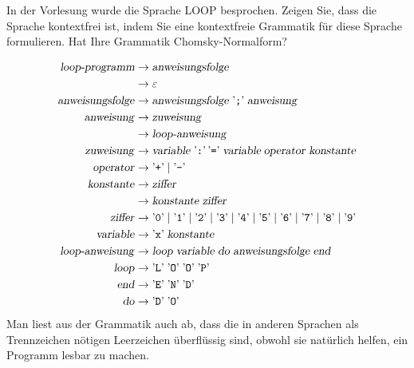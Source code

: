 In der Vorlesung wurde die Sprache LOOP besprochen. Zeigen Sie, dass
die Sprache kontextfrei ist, indem Sie eine
kontextfreie Grammatik für diese Sprache formulieren.
Hat Ihre Grammatik Chomsky-Normalform?


\begin{loesung}
\begin{align*}
\text{\textsl{loop-programm}}&\to\text{\textsl{anweisungsfolge}}\\
&\to\varepsilon\\
\text{\textsl{anweisungsfolge}}
&\to\text{\textsl{anweisungsfolge}}\;\text{'{\tt ;}'}\;
\text{\textsl{anweisung}}
\\
\text{\textsl{anweisung}}
&\to\text{\textsl{zuweisung}}
\\
&\to\text{\textsl{loop-anweisung}}
\\
\text{\textsl{zuweisung}}
&\to
\text{\textsl{variable}}\; \text{'{\tt :}'}\, \text{'{\tt =}'}\;
\textsl{variable}\;\text{\textsl{operator}}\;\text{\textsl{konstante}}
\\
\text{\textsl{operator}}
&\to\text{'{\tt +}'}\;|\;\text{'{\tt -}'}
\\
\text{\textsl{konstante}}&\to\text{\textsl{ziffer}}\\
&\to\text{\textsl{konstante}}\;\text{\textsl{ziffer}}
\\
\text{\textsl{ziffer}}&\to 
\text{'{\tt 0}'}\;|\;
\text{'{\tt 1}'}\;|\;
\text{'{\tt 2}'}\;|\;
\text{'{\tt 3}'}\;|\;
\text{'{\tt 4}'}\;|\;
\text{'{\tt 5}'}\;|\;
\text{'{\tt 6}'}\;|\;
\text{'{\tt 7}'}\;|\;
\text{'{\tt 8}'}\;|\;
\text{'{\tt 9}'}\\
\text{\textsl{variable}}&\to \text{'{\tt x}'}\;\text{\textsl{konstante}}\\
\text{\textsl{loop-anweisung}}&\to
\text{\textsl{loop}}\;
\text{\textsl{variable}}\;
\text{\textsl{do}}\;
\text{\textsl{anweisungsfolge}}\;
\text{\textsl{end}}\\
\text{\textsl{loop}}&\to \text{'{\tt L}'}\; \text{'{\tt O}'}\; \text{'{\tt O}'}\; \text{'{\tt P}'}\\
\text{\textsl{end}}&\to \text{'{\tt E}'}\; \text{'{\tt N}'}\; \text{'{\tt D}'}\\
\text{\textsl{do}}&\to \text{'{\tt D}'}\; \text{'{\tt O}'} \\
\end{align*}
Man liest aus der Grammatik auch ab, dass die in anderen Sprachen als
Trennzeichen nötigen Leerzeichen überflüssig sind, obwohl sie natürlich
helfen, ein Programm lesbar zu machen.


\end{loesung}
